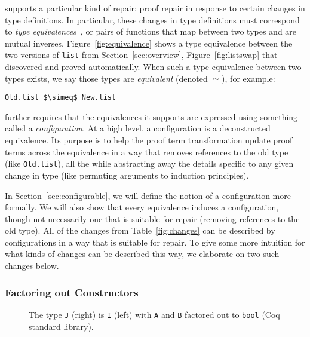 \toolname supports a particular kind of repair: proof repair in response to certain changes in type definitions.
In particular, these changes in type definitions must correspond to \textit{type equivalences}~\cite{univalent2013homotopy},
or pairs of functions that map between two types and are mutual inverses.
Figure~\ref{fig:equivalence} shows a type equivalence between the two versions of \lstinline{list}
from Section~\ref{sec:overview}, Figure~\ref{fig:listswap} that \toolname discovered and proved automatically.
When such a type equivalence between two types exists, we say those types are \textit{equivalent} (denoted $\simeq$), for example:

\begin{lstlisting}
Old.list $\simeq$ New.list
\end{lstlisting}

\toolname further requires that the equivalences it supports are expressed using something called a \textit{configuration}.
At a high level, a configuration is a deconstructed equivalence.
Its purpose is to help the proof term transformation update proof terms across the equivalence in a way that removes
references to the old type (like \lstinline{Old.list}), all the while abstracting away the details specific to any given change in type
(like permuting arguments to induction principles).

In Section~\ref{sec:configurable}, we will define the notion of a configuration more formally.
We will also show that every equivalence induces a configuration, %
though not necessarily one that is suitable for repair (removing references to the old type).
All of the changes from Table~\ref{fig:changes} can be described by configurations in a way that is suitable for repair.
To give some more intuition for what kinds of changes can be described this way, we elaborate on two such changes below.

\subsubsection{Factoring out Constructors}
\label{sec:ex1}

\begin{figure}
\begin{minipage}{0.48\columnwidth}

\end{minipage}
\hfill
\begin{minipage}{0.48\columnwidth}

\end{minipage}
\vspace{-0.3cm}
\caption{The type \lstinline{J} (right) is \lstinline{I} (left) with \lstinline{A} and \lstinline{B} factored out to \lstinline{bool} (Coq standard library).}
\label{fig:equivalence2}
\end{figure}

